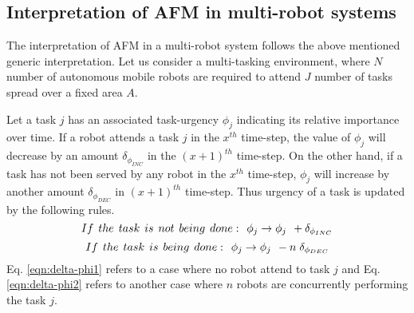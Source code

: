 \documentclass{intech}
\begin{document}
\subsection{Interpretation of AFM in multi-robot systems}
\label{afm:mrs-interpretation}
The interpretation of AFM in a multi-robot system follows the above mentioned generic interpretation. Let us consider a multi-tasking environment, where $N$ number of autonomous mobile robots are required to attend $J$ number of tasks spread over a fixed area $A$. 

Let a task $j$ has an associated task-urgency $\phi_j$ indicating its relative importance over time.
If a robot attends a task $j$ in the $x^{th}$ time-step, the value of $\phi_j$ will decrease by an amount $\delta_{\phi_{INC}}$ in the $(x+1)^{th}$ time-step.
On the other hand, if a task has not been served by any robot in the $x^{th}$ time-step, $\phi_j$ will increase by another amount  $\delta_{\phi_{DEC}}$  in $(x+1)^{th}$ time-step. Thus
urgency of a task is updated by the following rules.
\begin{equation}
 If\hspace*{0.15cm}the\hspace*{0.15cm} task\hspace*{0.15cm}is\hspace*{0.15cm}not\hspace*{0.15cm}being\hspace*{0.15cm} done:\hspace*{0.15cm}  \phi_j \rightarrow   \phi_j \hspace*{0.15cm} + \delta_{\phi_{INC}}
\label{eqn:delta-phi1}
\end{equation}
\begin{equation}
 If\hspace*{0.15cm}the \hspace*{0.15cm}task\hspace*{0.15cm}is\hspace*{0.15cm}being\hspace*{0.15cm}done:\hspace*{0.15cm}  \phi_j \rightarrow   \phi_j \hspace*{0.15cm} - n\hspace*{0.10cm}\delta_{\phi_{DEC}}
\label{eqn:delta-phi2}
\end{equation}
Eq. \ref{eqn:delta-phi1} refers to a case where no robot attend to task $j$ and Eq. \ref{eqn:delta-phi2} refers to another case where $n$ robots are concurrently performing the task $j$.
\end{document}
